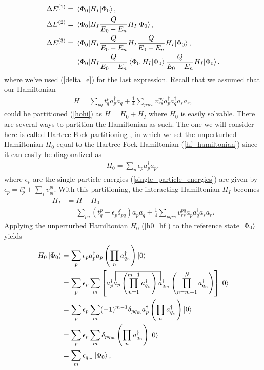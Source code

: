 \documentclass[Dual]{msu-thesis}
\begin{document}
\begin{align}
\label{delta_e1}
\Delta E^{(1)}
=& \ 
\mel{\Phi_0}{H_I}{\Phi_0},
\\
\label{delta_e2}
\Delta E^{(2)}
=& \ 
\mel{\Phi_0}{H_I\frac{Q}{E_0-E_n}H_I}{\Phi_0},
\\
\label{delta_e3}
\Delta E^{(3)}
=& \ 
\mel{\Phi_0}{H_I\frac{Q}{E_0-E_n}H_I\frac{Q}{E_0-E_n}H_I}{\Phi_0},
\\
-& \ 
\mel{\Phi_0}{H_I\frac{Q}{E_0-E_n}\mel{\Phi_0}{H_I}{\Phi_0}\frac{Q}{E_0-E_n}H_I}{\Phi_0},
\end{align}
where we've used (\ref{delta_e}) for the last expression. Recall that we assumed that our Hamiltonian
\begin{align}
H
=
\sum_{pq}t^p_qa^\dagger_pa_q+\frac{1}{4}\sum_{pqrs}v^{pq}_{rs}a^\dagger_pa^\dagger_qa_sa_r,
\end{align}
could be partitioned (\ref{hohi}) as $H=H_0+H_I$ where $H_0$ is easily solvable. There are several ways to partition the Hamiltonian as such. The one we will consider here is called Hartree-Fock partitioning \cite{partition}, in which we set the unperturbed Hamiltonian $H_0$ equal to the Hartree-Fock Hamiltonian (\ref{hf_hamiltonian}) since it can easily be diagonalized as
\begin{align}
\label{h0_hf}
H_0=\sum_p\epsilon_pa^\dagger_pa_p,
\end{align}
where $\epsilon_p$ are the single-particle energies (\ref{single_particle_energies}) are given by $\epsilon_p=t^p_p+\sum_iv^{pi}_{pi}$. With this partitioning, the interacting Hamiltonian $H_I$ becomes
\begin{align}
H_I
&=
H-H_0
\nonumber
\\
&=
\sum_{pq}(t^p_q-\epsilon_p\delta_{pq})a^\dagger_pa_q+\frac{1}{4}\sum_{pqrs}v^{pq}_{rs}a^\dagger_pa^\dagger_qa_sa_r.
\end{align}
Applying the unperturbed Hamiltonian $H_0$ (\ref{h0_hf}) to the reference state $\ket{\Phi_0}$ yields
\begin{align}
H_0\ket{\Phi_0}
&=
\sum_p\epsilon_pa^\dagger_pa_p
\left(\prod_na^\dagger_{q_n}\right)\ket{0}
\\
&=
\sum_p\epsilon_p
\sum_m
\left[
\contraction[3ex]{a^\dagger_p}{a}{_p
\left(\prod_{n=1}^{m-1}a^\dagger_{q_n}\right)}{a}
a^\dagger_pa_p
\left(\prod_{n=1}^{m-1}a^\dagger_{q_n}\right)
a^\dagger_{q_m}
\left(\prod_{n=m+1}^{N}a^\dagger_{q_n}\right)
\right]
\ket{0}
\\
&=
\sum_p\epsilon_p
\sum_m
(-1)^{m-1}
\delta_{pq_m}
a^\dagger_p
\left(\prod_na^\dagger_{q_n}\right)
\ket{0}
\\
&=
\sum_p\epsilon_p
\sum_m
\delta_{pq_m}
\left(\prod_na^\dagger_{q_n}\right)
\ket{0}
\\
&=
\label{h0p0=e0p0}
\sum_{m}\epsilon_{q_m}\ket{\Phi_0},
\end{align}
\end{document}
